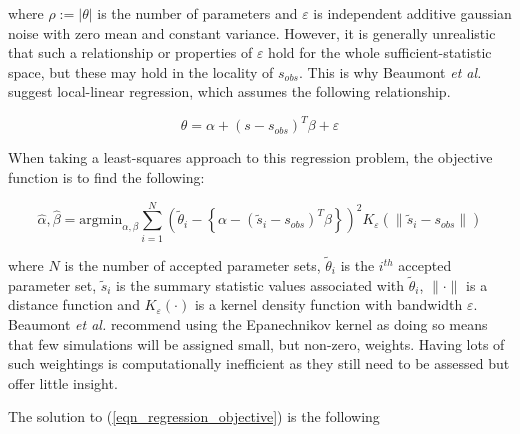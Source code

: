 \documentclass[11pt,a4paper]{article}
\theoremstyle{break}
\begin{document}
  where $\rho:=|\theta|$ is the number of parameters and $\varepsilon$ is independent additive gaussian noise with zero mean and constant variance. However, it is generally unrealistic that such a relationship or properties of $\varepsilon$ hold for the whole sufficient-statistic space, but these may hold in the locality of $s_{obs}$. This is why Beaumont \textit{et al.} suggest local-linear regression, which assumes the following relationship.

  \[ \theta=\alpha+(s-s_{obs})^T\beta+\varepsilon \]

  \par When taking a least-squares approach to this regression problem, the objective function is to find the following:

  \begin{equation}\label{eqn_regression_objective}
    \hat\alpha,\hat\beta=\text{argmin}_{\alpha,\beta}\sum_{i=1}^N\left(\tilde\theta_i-\left\{\alpha-(\tilde{s}_i-s_{obs})^T\beta\right\}\right)^2K_\varepsilon\left(\|\tilde{s}_i-s_{obs}\|\right)
  \end{equation}

  where $N$ is the number of accepted parameter sets, $\tilde\theta_i$ is the $i^{th}$ accepted parameter set, $\tilde{s}_i$ is the summary statistic values associated with $\tilde\theta_i$, $\|\cdot\|$ is a distance function and $K_\varepsilon(\cdot)$ is a kernel density function with bandwidth $\varepsilon$. Beaumont \textit{et al.} recommend using the Epanechnikov kernel as doing so means that few simulations will be assigned small, but non-zero, weights. Having lots of such weightings is computationally inefficient as they still need to be assessed but offer little insight.

  \par The solution to (\ref{eqn_regression_objective}) is the following
\end{document}
